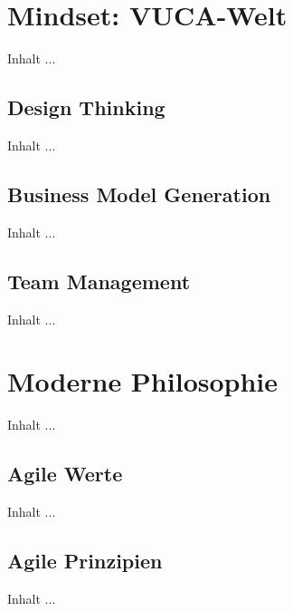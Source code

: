 \section{Mindset: VUCA-Welt}
Inhalt ...

\subsection{Design Thinking}
Inhalt ...

\subsection{Business Model Generation}
Inhalt ...

\subsection{Team Management}
Inhalt ...



\section{Moderne Philosophie}
Inhalt ...

\subsection{Agile Werte}
Inhalt ...

\subsection{Agile Prinzipien}
Inhalt ...
